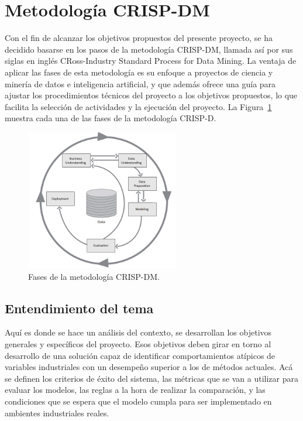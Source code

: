 \documentclass[11pt,a4paper,spanish]{book}
\numberwithin{equation}{chapter}
\numberwithin{figure}{chapter}
\begin{document}
\section{Metodología CRISP-DM}

Con el fin de alcanzar los objetivos propuestos del presente proyecto, se ha decidido 
basarse en los pasos de la metodología  CRISP-DM, llamada así por sus siglas en inglés 
CRoss-Industry Standard Process for Data Mining. La ventaja de aplicar las fases de esta
metodología es su enfoque a proyectos de ciencia y minería de datos e inteligencia 
artificial, y que además ofrece una guía para ajustar los procedimientos técnicos del 
proyecto a los objetivos propuestos, lo que facilita la selección de actividades y 
la ejecución del proyecto. La Figura~\ref{fig:figCrispdm} muestra cada una de las fases de la metodología 
CRISP-D.


\begin{figure}[h]
    \centering
    \includegraphics[width=0.6\textwidth]{media/crisp-dm.png}
    \caption{Fases de la metodología {CRISP-DM}.  \protect\cite{chapman2000crisp} }
    \label{fig:figCrispdm}
\end{figure}



\subsection{Entendimiento del tema}

Aquí es donde se hace un análisis del contexto, se desarrollan los objetivos generales 
y específicos del proyecto. Esos objetivos deben girar en torno al desarrollo de una 
solución capaz de identificar comportamientos atípicos de variables industriales con un 
desempeño superior a los de métodos actuales. Acá se definen los criterios de éxito del
sistema, las métricas que se van a utilizar para evaluar los modelos, las reglas a la 
hora de realizar la comparación, y las condiciones que se espera que el modelo cumpla 
para ser implementado en ambientes industriales reales. 
\end{document}
